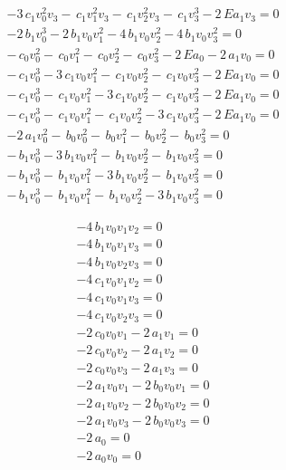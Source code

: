 \documentclass[11pt]{beamer}
\begin{document}
\begin{frame}
\begin{minipage}{.7\linewidth}
\begin{equation*}
\begin{array}{r}
-3 \, c_{1} v_{0}^{2} v_{3} -  \, c_{1} v_{1}^{2} v_{3} -  \, c_{1} v_{2}^{2} v_{3} -  \, c_{1} v_{3}^{3} - 2 \, E a_{1} v_{3} =0\\
-2 \, b_{1} v_{0}^{3} - 2 \, b_{1} v_{0} v_{1}^{2} - 4 \, b_{1} v_{0} v_{2}^{2} - 4 \, b_{1} v_{0} v_{3}^{2} =0\\
- \, c_{0} v_{0}^{2} -  \, c_{0} v_{1}^{2} -  \, c_{0} v_{2}^{2} -  \, c_{0} v_{3}^{2} - 2 \, E a_{0} - 2 \, a_{1} v_{0} =0\\
- \, c_{1} v_{0}^{3} - 3 \, c_{1} v_{0} v_{1}^{2} -  \, c_{1} v_{0} v_{2}^{2} -  \, c_{1} v_{0} v_{3}^{2} - 2 \, E a_{1} v_{0} =0\\
- \, c_{1} v_{0}^{3} -  \, c_{1} v_{0} v_{1}^{2} - 3 \, c_{1} v_{0} v_{2}^{2} -  \, c_{1} v_{0} v_{3}^{2} - 2 \, E a_{1} v_{0} =0\\
- \, c_{1} v_{0}^{3} -  \, c_{1} v_{0} v_{1}^{2} -  \, c_{1} v_{0} v_{2}^{2} - 3 \, c_{1} v_{0} v_{3}^{2} - 2 \, E a_{1} v_{0} =0\\
-2 \, a_{1} v_{0}^{2} -  \, b_{0} v_{0}^{2} -  \, b_{0} v_{1}^{2} -  \, b_{0} v_{2}^{2} -  \, b_{0} v_{3}^{2} =0\\
- \, b_{1} v_{0}^{3} - 3 \, b_{1} v_{0} v_{1}^{2} -  \, b_{1} v_{0} v_{2}^{2} -  \, b_{1} v_{0} v_{3}^{2} =0\\
- \, b_{1} v_{0}^{3} -  \, b_{1} v_{0} v_{1}^{2} - 3 \, b_{1} v_{0} v_{2}^{2} -  \, b_{1} v_{0} v_{3}^{2} =0\\
- \, b_{1} v_{0}^{3} -  \, b_{1} v_{0} v_{1}^{2} -  \, b_{1} v_{0} v_{2}^{2} - 3 \, b_{1} v_{0} v_{3}^{2} =0
\end{array}
\end{equation*}
\end{minipage}%
\begin{minipage}{.3\linewidth}
\begin{equation*}
\begin{array}{r}
-4 \, b_{1} v_{0} v_{1} v_{2} =0\\
-4 \, b_{1} v_{0} v_{1} v_{3} =0\\
-4 \, b_{1} v_{0} v_{2} v_{3} =0\\
-4 \, c_{1} v_{0} v_{1} v_{2} =0\\
-4 \, c_{1} v_{0} v_{1} v_{3} =0\\
-4 \, c_{1} v_{0} v_{2} v_{3} =0\\
-2 \, c_{0} v_{0} v_{1} - 2 \, a_{1} v_{1} =0\\
-2 \, c_{0} v_{0} v_{2} - 2 \, a_{1} v_{2} =0\\
-2 \, c_{0} v_{0} v_{3} - 2 \, a_{1} v_{3} =0\\
-2 \, a_{1} v_{0} v_{1} - 2 \, b_{0} v_{0} v_{1} =0\\
-2 \, a_{1} v_{0} v_{2} - 2 \, b_{0} v_{0} v_{2} =0\\
-2 \, a_{1} v_{0} v_{3} - 2 \, b_{0} v_{0} v_{3} =0\\
-2 \, a_{0} =0\\
-2 \, a_{0} v_{0} =0\\
\end{array}
\end{equation*}
\end{minipage}
\end{frame}
\end{document}
